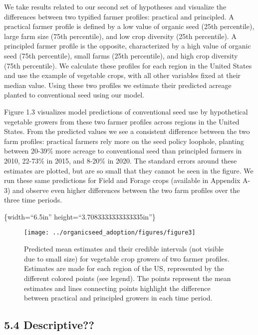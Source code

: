 \documentclass[twoside,12pt,final]{ucthesis-CA2012}
\begin{document}
\begin{ucmainmatter}
We take results related to our second set of hypotheses and visualize
the differences between two typified farmer profiles: practical and
principled. A practical farmer profile is defined by a low value of
organic seed (25th percentile), large farm size (75th percentile), and
low crop diversity (25th percentile). A principled farmer profile is the
opposite, characterized by a high value of organic seed (75th
percentile), small farms (25th percentile), and high crop diversity
(75th percentile). We calculate these profiles for each region in the
United States and use the example of vegetable crops, with all other
variables fixed at their median value. Using these two profiles we
estimate their predicted acreage planted to conventional seed using our
model.

Figure 1.3 visualizes model predictions of conventional seed use by
hypothetical vegetable growers from these two farmer profiles across
regions in the United States. From the predicted values we see a
consistent difference between the two farm profiles: practical farmers
rely more on the seed policy loophole, planting between 20-39\% more
acreage to conventional seed than principled farmers in 2010, 22-73\% in
2015, and 8-20\% in 2020. The standard errors around these estimates are
plotted, but are so small that they cannot be seen in the figure. We run
these same predictions for Field and Forage crops (available in Appendix
A-3) and observe even higher differences between the two farm profiles
over the three time periods.

\{width=``6.5in'' height=``3.7083333333333335in''\}
\begin{figure}

{\centering \texttt{[image: ../organicseed\_adoption/figures/figure3]} 

}

\caption{Predicted mean estimates and their credible intervals (not visible due to small size) for vegetable crop growers of two farmer profiles. Estimates are made for each region of the US, represented by the different colored points (see legend). The points represent the mean estimates and lines connecting points highlight the difference between practical and principled growers in each time period.}\label{fig:unnamed-chunk-12}
\end{figure}
\hypertarget{descriptive}{%
\subsection{5.4 Descriptive??}\label{descriptive}}


\end{ucmainmatter}
\end{document}
